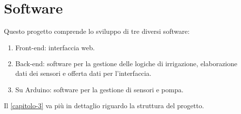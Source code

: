 \documentclass[12pt,a4paper,openright,twoside, openany]{book}
\begin{document}
\section{Software}

Questo progetto comprende lo sviluppo di tre diversi software:
\begin{enumerate}
    \item Front-end: interfaccia web.
    \item Back-end: software per la gestione delle logiche di irrigazione, elaborazione dati dei sensori e offerta dati per l'interfaccia.
    \item Su Arduino: software per la gestione di sensori e pompa.
\end{enumerate}
Il \cref{capitolo-3} va più in dettaglio riguardo la struttura del progetto.
\end{document}
